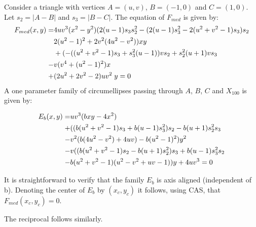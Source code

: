 Consider a triangle with vertices $A=(u,v)$, $B=(-1,0)$ and $C=(1,0).$ Let $s_2=|A-B|$ and $s_3=|B-C|$.
The equation of $F_{med}$ is given by:
{\small  
\begin{equation}    
\aligned 
F_{med}(x,y)=&4 u v^3(x^2- y^2) (2( u-1)  s_3  s_2^2-( 2(u-1)  s_3^2-2( u^2+ v^2-1) s_3)s_2\\ 
&2(u^2-1)^2+2v^2(4u^2-v^2)) xy\\
&+(-((u^2+v^2-1)  s_3+ s_3^2 (u-1)) v  s_2+ s_2^2 (u+1) v  s_3\\
-& v(v^4+(u^2-1)^2 ) x\\
+&(2 u^2+2 v^2-2)   u v^2\; y=0
\endaligned
\end{equation}
}
A one parameter family of circumellipses passing through $A$, $B$, $C$ and $X_{100}$ is given by:

\begin{equation}\aligned  
 E_b(x,y)
 =&  u v^3(bxy  -4  x^2)\\
 + &((b (u^2+v^2-1)  s_3+b (u-1)  s_3^2)  s_2-b (u+1)  s_2^2  s_3\\
 -&v^2(b(4u^2-v^2)+4uv)-b(u^2-1)^2) y^2\\ 
 -&v ((b (u^2+v^2-1)  s_2-b (u+1)  s_2^2)  s_3+b (u-1)  s_3^2  s_2\\
-&b(u^2+v^2-1) (  u^2-  v^2+  u v-1)) y+ 4 u v^3=0
 \endaligned
\end{equation}

It is
straightforward to verify that the family $E_b$ is
axis aligned (independent of b). Denoting the center of $E_b$ by $(x_c,y_c)$ it follows, using CAS, that $F_{med}(x_c,y_c)=0.$

The reciprocal
follows similarly.